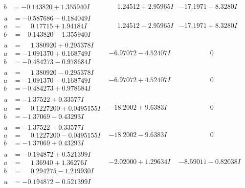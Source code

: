\documentclass[1p]{elsarticle_modified}
\theoremstyle{definition}
\begin{document}
$$\begin{array}{c|c|c}
\begin{aligned}
b &= -0.143820 + 1.355940 I\end{aligned}
 & \phantom{-}1.24512 + 2.95965 I & -17.1971 - 8.3280 I \\ \hline\begin{aligned}
u &= -0.587686 - 0.184049 I \\
a &= \phantom{-}0.17715 + 1.94184 I \\
b &= -0.143820 - 1.355940 I\end{aligned}
 & \phantom{-}1.24512 - 2.95965 I & -17.1971 + 8.3280 I \\ \hline\begin{aligned}
u &= \phantom{-}1.380920 + 0.295378 I \\
a &= -1.091370 + 0.168749 I \\
b &= -0.484273 - 0.978684 I\end{aligned}
 & -6.97072 - 4.52407 I & \phantom{-0.000000 } 0 \\ \hline\begin{aligned}
u &= \phantom{-}1.380920 - 0.295378 I \\
a &= -1.091370 - 0.168749 I \\
b &= -0.484273 + 0.978684 I\end{aligned}
 & -6.97072 + 4.52407 I & \phantom{-0.000000 } 0 \\ \hline\begin{aligned}
u &= -1.37522 + 0.33577 I \\
a &= \phantom{-}0.1227200 + 0.0495155 I \\
b &= -1.37069 - 0.43293 I\end{aligned}
 & -18.2002 + 9.6383 I & \phantom{-0.000000 } 0 \\ \hline\begin{aligned}
u &= -1.37522 - 0.33577 I \\
a &= \phantom{-}0.1227200 - 0.0495155 I \\
b &= -1.37069 + 0.43293 I\end{aligned}
 & -18.2002 - 9.6383 I & \phantom{-0.000000 } 0 \\ \hline\begin{aligned}
u &= -0.194872 + 0.521399 I \\
a &= \phantom{-}1.36940 + 1.36276 I \\
b &= \phantom{-}0.294275 - 1.219930 I\end{aligned}
 & -2.02000 + 1.29634 I & -8.59011 - 0.82038 I \\ \hline\begin{aligned}
u &= -0.194872 - 0.521399 I \\

\end{aligned}
\end{array}$$
\end{document}
